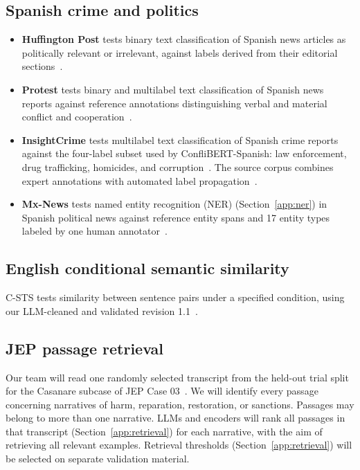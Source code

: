 \documentclass{article}
\begin{document}
\subsection{Spanish crime and politics}

\begin{itemize}
    \item \textbf{Huffington Post} tests binary text classification of Spanish news articles as politically relevant or irrelevant, against labels derived from their editorial sections~\cite{ConfliBERT-Spanish}.
    \item \textbf{Protest} tests binary and multilabel text classification of Spanish news reports against reference annotations distinguishing verbal and material conflict and cooperation~\cite{ConfliBERT-Spanish}.
    \item \textbf{InsightCrime} tests multilabel text classification of Spanish crime reports against the four-label subset used by ConfliBERT-Spanish: law enforcement, drug trafficking, homicides, and corruption~\cite{ConfliBERT-Spanish}. The source corpus combines expert annotations with automated label propagation~\cite{Parolin2021}.
    \item \textbf{Mx-News} tests named entity recognition (NER) (Section~\ref{app:ner}) in Spanish political news against reference entity spans and 17 entity types labeled by one human annotator~\cite{MxNews}.
\end{itemize}

\subsection{English conditional semantic similarity}
C-STS tests similarity between sentence pairs under a specified condition, using our LLM-cleaned and validated revision 1.1~\cite{C-STSCleaned}.

\subsection{JEP passage retrieval}
Our team will read one randomly selected transcript from the held-out trial split for the Casanare subcase of JEP Case 03~\cite{JEPCaso03}. We will identify every passage concerning narratives of harm, reparation, restoration, or sanctions. Passages may belong to more than one narrative. LLMs and encoders will rank all passages in that transcript (Section~\ref{app:retrieval}) for each narrative, with the aim of retrieving all relevant examples. Retrieval thresholds (Section~\ref{app:retrieval}) will be selected on separate validation material.
\end{document}
